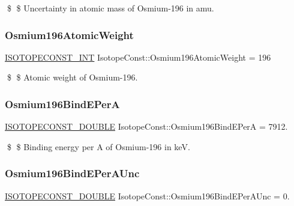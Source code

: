 \$ \$ Uncertainty in atomic mass of Osmium-\/196 in amu. \mbox{\label{group___isotope_const-_osmium-_os196_gac0148f1d3b6c4ccdb65df56f4ed95e56}} 
\subsubsection{\texorpdfstring{Osmium196\+Atomic\+Weight}{Osmium196AtomicWeight}}
{\footnotesize\ttfamily \mbox{\hyperlink{group___isotope_const-_macros_ga5f18360b3e99483a35c32d789e62621c}{I\+S\+O\+T\+O\+P\+E\+C\+O\+N\+S\+T\+\_\+\+I\+NT}} Isotope\+Const\+::\+Osmium196\+Atomic\+Weight = 196}

\$ \$ Atomic weight of Osmium-\/196. \mbox{\label{group___isotope_const-_osmium-_os196_ga0208e0b202f4e12c260ae90edabdad32}} 
\subsubsection{\texorpdfstring{Osmium196\+Bind\+E\+PerA}{Osmium196BindEPerA}}
{\footnotesize\ttfamily \mbox{\hyperlink{group___isotope_const-_macros_ga8f45a7272ce02c0b4c65c44636ed719a}{I\+S\+O\+T\+O\+P\+E\+C\+O\+N\+S\+T\+\_\+\+D\+O\+U\+B\+LE}} Isotope\+Const\+::\+Osmium196\+Bind\+E\+PerA = 7912.}

\$ \$ Binding energy per A of Osmium-\/196 in keV. \mbox{\label{group___isotope_const-_osmium-_os196_ga435deeca9073235ee04a0b55b73e73b4}} 
\subsubsection{\texorpdfstring{Osmium196\+Bind\+E\+Per\+A\+Unc}{Osmium196BindEPerAUnc}}
{\footnotesize\ttfamily \mbox{\hyperlink{group___isotope_const-_macros_ga8f45a7272ce02c0b4c65c44636ed719a}{I\+S\+O\+T\+O\+P\+E\+C\+O\+N\+S\+T\+\_\+\+D\+O\+U\+B\+LE}} Isotope\+Const\+::\+Osmium196\+Bind\+E\+Per\+A\+Unc = 0.}

